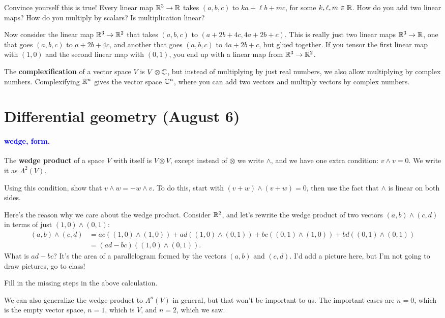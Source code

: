 \documentclass[11pt,paper=letter]{scrartcl}
\renewcommand{\bluebf}[1]{{\bfseries \color{Blue} #1}}
\renewcommand\wp[1]{\paragraph{\textcolor{Blue}{#1.}} \hspace{-1em}}
\newcommand\wl[1]{\label{w:#1}}
\begin{document}
\begin{exrboxed}
Convince yourself this is true! Every linear map $\mathbb R^3 \to \mathbb R$ takes $(a, b, c)$ to $ka + \ell b + mc$, for some $k, \ell, m \in \mathbb R$. How do you add two linear maps? How do you multiply by scalars? Is multiplication linear?
\end{exrboxed}

Now consider the linear map $\mathbb R^3 \to \mathbb R^2$ that takes $(a, b, c)$ to $(a + 2b + 4c, 4a + 2b + c)$. This is really just two linear maps $\mathbb R^3 \to \mathbb R$, one that goes $(a, b, c)$ to $a + 2b + 4c$, and another that goes $(a, b, c)$ to $4a + 2b + c$, but glued together. If you tensor the first linear map with $(1, 0)$ and the second linear map with $(0, 1)$, you end up with a linear map from $\mathbb R^3 \to \mathbb R^2$.

The \bluebf{complexification} of a vector space $V$ is $V \otimes \mathbb C$, but instead of multiplying by just real numbers, we also allow multiplying by complex numbers. Complexifying $\mathbb R^n$ gives the vector space $\mathbb C^n$, where you can add two vectors and multiply vectors by complex numbers.

\section{Differential geometry (August 6)}

\wp{wedge, form}
\wl{wedge}
\wl{form}
The \bluebf{wedge product} of a space $V$ with itself is $V \otimes V$, except instead of $\otimes$ we write $\wedge$, and we have one extra condition: $ v \wedge v = 0 $. We write it as $\Lambda^2(V)$.
\begin{exrboxed}
  Using this condition, show that $ v \wedge w = - w \wedge v $. To do this, start with $(v + w) \wedge (v + w) = 0$, then use the fact that $\wedge$ is linear on both sides.
\end{exrboxed}
Here's the reason why we care about the wedge product. Consider $\mathbb R^2$, and let's rewrite the wedge product of two vectors $(a, b) \wedge (c, d)$ in terms of just $(1, 0) \wedge (0, 1)$:
\begin{align*}
  (a, b) \wedge (c, d) &=
  ac((1, 0) \wedge (1, 0))
  + ad((1, 0) \wedge (0, 1))
  + bc((0, 1) \wedge (1, 0))
  + bd((0, 1) \wedge (0, 1)) \\
  &= (ad - bc)((1, 0) \wedge (0, 1)).
\end{align*}
What is $ad - bc$? It's the area of a parallelogram formed by the vectors $(a, b)$ and $(c, d)$. I'd add a picture here, but I'm not going to draw pictures, go to class!
\begin{exrboxed}
  Fill in the missing steps in the above calculation.
\end{exrboxed}
We can also generalize the wedge product to $\Lambda^n(V)$ in general, but that won't be important to us. The important cases are $n = 0$, which is the empty vector space, $n = 1$, which is $V$, and $n = 2$, which we saw.
\end{document}
